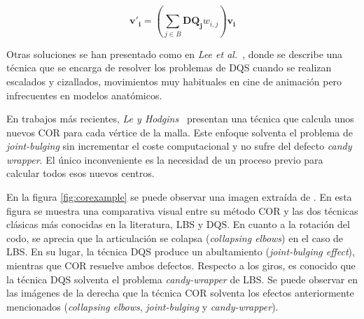 \begin{equation}
\label{eqn:DQS}
\mathbf{v'_{i}} = (\sum_{j \in B} \mathbf{DQ_{j}}w_{i,j}) \mathbf{v_{i}}
\end{equation}

Otras soluciones se han presentado como en \emph{Lee et al.}~\cite{Lee2013}, donde se describe una técnica que se encarga de resolver los problemas de \ac{DQS} cuando se realizan escalados y cizallados, movimientos muy habituales en cine de animación pero infrecuentes en modelos anatómicos.

En trabajos más recientes, \emph{Le y Hodgins}~\cite{le2016real} presentan una técnica que calcula unos nuevos \ac{COR} para cada vértice de la malla. Este enfoque solventa el problema de \emph{joint-bulging} sin incrementar el coste computacional y no sufre del defecto \emph{candy wrapper}. El único inconveniente es la necesidad de un proceso previo para calcular todos esos nuevos centros.

En la figura \ref{fig:corexample} se puede observar una imagen extraída de \cite{le2016real}. En esta figura se muestra una comparativa visual entre su método \ac{COR} y las dos técnicas clásicas más conocidas en la literatura, \ac{LBS} y \ac{DQS}. En cuanto a la rotación del codo, se aprecia que la articulación se colapsa (\emph{collapsing elbows}) en el caso de \ac{LBS}. En su lugar, la técnica \ac{DQS} produce un abultamiento (\emph{joint-bulging effect}), mientras que \ac{COR} resuelve ambos defectos. Respecto a los giros, es conocido que la técnica \ac{DQS} solventa el problema \emph{candy-wrapper} de \ac{LBS}. Se puede observar en las imágenes de la derecha que la técnica \ac{COR} solventa los efectos anteriormente mencionados (\emph{collapsing elbows}, \emph{joint-bulging} y \emph{candy-wrapper}). 

